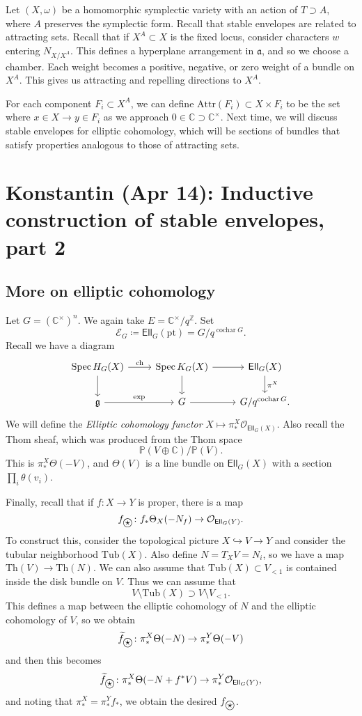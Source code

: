 \documentclass[leqno, openany]{memoir}
\theoremstyle{definition}
\theoremstyle{remark}
\theoremstyle{plain}
\theoremstyle{definition}
\theoremstyle{remark}
\newcommand{\C}{\mathbb{C}}
\newcommand{\Z}{\mathbb{Z}}
\renewcommand{\P}{\mathbb{P}}
\newcommand{\g}{\mathfrak{g}}
\newcommand{\mc}[1]{\mathcal{#1}}
\newcommand{\mf}[1]{\mathfrak{#1}}
\newcommand{\mr}[1]{\mathrm{#1}}
\newcommand{\ms}[1]{\mathsf{#1}}
\newcommand{\on}[1]{\operatorname{#1}}
\newcommand{\wt}[1]{\widetilde{#1}}
\newcommand{\ostar}{\stackMath\mathbin{\stackinset{c}{0ex}{c}{0ex}{\star}{\bigcirc}}}
\DeclareMathOperator{\Spec}{Spec}
\begin{document}
Let $(X, \omega)$ be a homomorphic symplectic variety with an action of $T \supset A$, where $A$ preserves the symplectic form. Recall that stable envelopes are related to attracting sets. Recall that if $X^A \subset X$ is the fixed locus, consider characters $w$ entering $N_{X/X^A}$. This defines a hyperplane arrangement in $\mf{a}$, and so we choose a chamber. Each weight becomes a positive, negative, or zero weight of a bundle on $X^A$. This gives us attracting and repelling directions to $X^A$.

For each component $F_i \subset X^A$, we can define $\mr{Attr}(F_i) \subset X \times F_i$ to be the set where $x \in X \to y \in F_i$ as we approach $0 \in \C \supset \C^{\times}$. Next time, we will discuss stable envelopes for elliptic cohomology, which will be sections of bundles that satisfy properties analogous to those of attracting sets.

\chapter{Konstantin (Apr 14): Inductive construction of stable envelopes, part 2}%

\section{More on elliptic cohomology}

Let $G = (\C^{\times})^n$. We again take $E = \C^{\times} / q^{\Z}$. Set
\[ \mc{E}_G \coloneqq \ms{Ell}_G(\mr{pt}) = G/q^{\on{cochar} G}. \]
Recall we have a diagram
\begin{equation*}
\begin{tikzcd}
    \Spec H_G(X) \ar{r}{\mr{ch}} \ar{d} & \Spec K_G(X) \ar{r} \ar{d} & \ms{Ell}_G(X) \ar{d}{\pi^X} \\
    \g \ar{r}{\exp} & G \ar{r} & G/q^{\on{cochar} G}.
\end{tikzcd}
\end{equation*}
We will define the \textit{Elliptic cohomology functor} $X \mapsto \pi_*^X \mc{O}_{\ms{Ell}_G(X)}$. Also recall the Thom sheaf, which was produced from the Thom space
\[ \P(V \oplus \C) / \P(V). \]
This is $\pi_*^X \Theta(-V)$, and $\Theta(V)$ is a line bundle on $\ms{Ell}_G(X)$ with a section $\prod_i \theta(v_i)$.

Finally, recall that if $f \colon X \to Y$ is proper, there is a map
\[ f_{\ostar} \colon f_* \Theta_X(-N_f) \to \mc{O}_{\ms{Ell}_G(Y)}. \]
To construct this, consider the topological picture $X \hookrightarrow V \to Y$ and consider the tubular neighborhood $\mr{Tub}(X)$. Also define $N = T_X V = N_i$, so we have a map $\mr{Th}(V) \to \mr{Th}(N)$. We can also assume that $\mr{Tub}(X) \subset V_{<1}$ is contained inside the disk bundle on $V$. Thus we can assume that
\[ V \setminus \mr{Tub}(X) \supset V \setminus V_{<1}. \]
This defines a map between the elliptic cohomology of $N$ and the elliptic cohomology of $V$, so we obtain
\[ \wt{f}_{\ostar} \colon \pi_*^X \Theta(-N) \to \pi_*^Y \Theta(-V) \]
and then this becomes
\[ \wt{f}_{\ostar} \colon \pi_*^X \Theta(-N + f^* V) \to \pi_*^Y \mc{O}_{\ms{Ell}_G(Y)}, \]
and noting that $\pi_*^X = \pi_*^Y f_*$, we obtain the desired $f_{\ostar}$.
\end{document}
